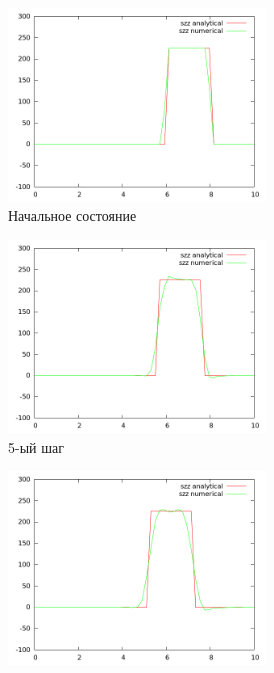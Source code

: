 \begin{figure}[H]
\begin{subfigure}[b]{0.5\textwidth}
\centering
\includegraphics[width=0.75\textwidth]{png/veryfication/0.4/p-wave-along-z0.png}
\caption{Начальное состояние}
\end{subfigure}
\begin{subfigure}[b]{0.5\textwidth}
\centering
\includegraphics[width=0.75\textwidth]{png/veryfication/0.4/p-wave-along-z5.png}
\caption{5-ый шаг}
\end{subfigure}
\begin{subfigure}[b]{0.5\textwidth}
\centering
\includegraphics[width=0.75\textwidth]{png/veryfication/0.4/p-wave-along-z10.png}

\end{subfigure}
\end{figure}
